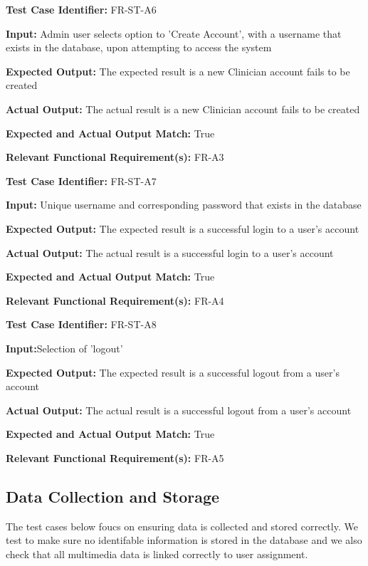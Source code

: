 \documentclass[12pt, titlepage]{article}
\begin{document}
\begin{mdframed}[linewidth=0.5mm] \par
  \textbf{Test Case Identifier:} FR-ST-A6 \par
  \textbf{Input:} Admin user selects option to ’Create Account’, with a username that exists
  in the database, upon attempting to access the system \par
  \textbf{Expected Output:} The expected result is a new Clinician account fails to be created \par
  \textbf{Actual Output:} The actual result is a new Clinician account fails to be created \par
  \textbf{Expected and Actual Output Match:} True \par
  \textbf{Relevant Functional Requirement(s):} FR-A3
\end{mdframed}

\begin{mdframed}[linewidth=0.5mm] \par
  \textbf{Test Case Identifier:} FR-ST-A7 \par
  \textbf{Input:} Unique username and corresponding password that exists in the database \par
  \textbf{Expected Output:} The expected result is a successful login to a user’s account \par
  \textbf{Actual Output:} The actual result is a successful login to a user’s account \par
  \textbf{Expected and Actual Output Match:} True \par
  \textbf{Relevant Functional Requirement(s):} FR-A4
\end{mdframed}

\begin{mdframed}[linewidth=0.5mm] \par
  \textbf{Test Case Identifier:} FR-ST-A8 \par
  \textbf{Input:}Selection of 'logout' \par
  \textbf{Expected Output:} The expected result is a successful logout from a user’s account \par
  \textbf{Actual Output:} The actual result is a successful logout from a user’s account\par
  \textbf{Expected and Actual Output Match:} True \par
  \textbf{Relevant Functional Requirement(s):} FR-A5
\end{mdframed}

\subsection{Data Collection and Storage}
\hspace{2em}The test cases below foucs on ensuring data is collected and stored correctly. We test to make sure
no identifable information is stored in the database and we also check that all multimedia data is linked correctly to user assignment.
\end{document}
